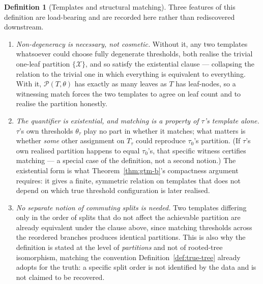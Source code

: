 \documentclass[11pt]{article}
\theoremstyle{plain}
\theoremstyle{definition}
\newtheorem{definition}[theorem]{Definition}
\theoremstyle{remark}
\newcommand{\cX}{\mathcal{X}}
\begin{document}
\begin{definition}[Templates and structural matching]
Three features of this definition are load-bearing and are recorded here
rather than rediscovered downstream.
\begin{enumerate}[label=(\roman*),leftmargin=*]
  \item \emph{Non-degeneracy is necessary, not cosmetic.} Without it, any two
  templates whatsoever could choose fully degenerate thresholds, both realise
  the trivial one-leaf partition \(\{\cX\}\), and so satisfy the existential
  clause --- collapsing the relation to the trivial one in which everything is
  equivalent to everything. With it, \(\mathcal P(T,\theta)\) has exactly as
  many leaves as \(T\) has leaf-nodes, so a witnessing match forces the two
  templates to agree on leaf count and to realise the partition honestly.
  \item \emph{The quantifier is existential, and matching is a property of
  \(\tau\)'s template alone.} \(\tau\)'s own thresholds \(\theta_\tau\) play
  no part in whether it matches; what matters is whether \emph{some} other
  assignment on \(T_\tau\) could reproduce \(\tau_0\)'s partition. (If
  \(\tau\)'s own realised partition happens to equal \(\tau_0\)'s, that
  specific witness certifies matching --- a special case of the definition,
  not a second notion.) The existential form is what
  Theorem~\ref{thm:gtm-b}'s compactness argument requires: it gives a finite,
  symmetric relation on templates that does not depend on which true
  threshold configuration is later realised.
  \item \emph{No separate notion of commuting splits is needed.} Two templates
  differing only in the order of splits that do not affect the achievable
  partition are already equivalent under the clause above, since matching
  thresholds across the reordered branches produces identical partitions. This
  is also why the definition is stated at the level of \emph{partitions} and
  not of rooted-tree isomorphism, matching the convention
  Definition~\ref{def:true-tree} already adopts for the truth: a specific
  split order is not identified by the data and is not claimed to be
  recovered.
\end{enumerate}
\end{definition}
\end{document}
